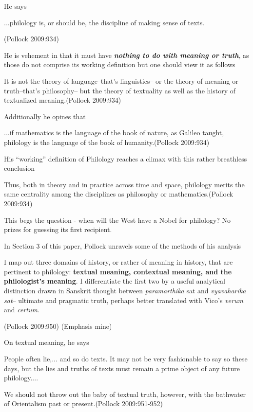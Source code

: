 He says 
\begin{myquote}
...philology is, or should be, the discipline of making sense of texts.

\hfill (Pollock 2009:934)
\end{myquote}

He is vehement in that it must have {{\sl\bfseries nothing to do with meaning or truth}\relax}, as those do not comprise its working definition but one should view it as follows
\begin{myquote}
It is not the theory of language--that's linguistics-- or the theory of meaning or truth--that's philosophy-- but the theory of textuality as well as the history of textualized meaning.\hfill (Pollock 2009:934)
\end{myquote}

Additionally he opines that
\begin{myquote}
...if mathematics is the language of the book of nature, as Galileo taught, philology is the language of the book of humanity.\hfill (Pollock 2009:934)
\end{myquote}

His ``working'' definition of Philology reaches a climax with this rather breathless conclusion
\begin{myquote}
Thus, both in theory and in practice across time and space, philology merits the same centrality among the disciplines as philosophy or mathematics.\hfill (Pollock 2009:934)
\end{myquote}

This begs the question - when will the West have a Nobel for philology? No prizes for guessing its first recipient.

In Section 3 of this paper, Pollock unravels some of the methods of his analysis
\begin{myquote}
I map out three domains of history, or rather of meaning in history, that are pertinent to philology: {\bf textual meaning, contextual meaning, and the philologist's meaning}. I differentiate the first two by a useful analytical distinction drawn in Sanskrit thought between {\sl paramarthika} sat and {\sl vyavaharika sat}-- ultimate and pragmatic truth, perhaps better translated with Vico's {\sl verum} and {\sl certum}.

\hfill (Pollock 2009:950) (Emphasis mine)
\end{myquote}

On textual meaning, he says
\begin{myquote}
People often lie,... and so do texts. It may not be very fashionable to say so these days, but the lies and truths of texts must remain a prime object of any future philology....

We should not throw out the baby of textual truth, however, with the bathwater of Orientalism past or present.\hfill (Pollock 2009:951-952)
\end{myquote}

